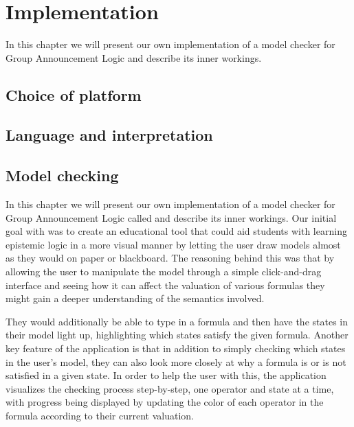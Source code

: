 \section{Implementation}\label{sec:impl}

In this chapter we will present our own implementation of a model checker for Group Announcement Logic and describe its inner workings.

\subsection{Choice of platform}

\subsection{Language and interpretation}

\subsection{Model checking}




In this chapter we will present our own implementation of a model checker for Group Announcement Logic called \cname and describe its inner workings. Our initial goal with \cname was to create an educational tool that could aid students with learning epistemic logic in a more visual manner by letting the user draw models almost as they would on paper or blackboard. The reasoning behind this was that by allowing the user to manipulate the model through a simple click-and-drag interface and seeing how it can affect the valuation of various formulas they might gain a deeper understanding of the semantics involved.

They would additionally be able to type in a formula and then have the states in their model light up, highlighting which states satisfy the given formula. Another key feature of the application is that in addition to simply checking which states in the user's model, they can also look more closely at why a formula is or is not satisfied in a given state. In order to help the user with this, the application visualizes the checking process step-by-step, one operator and state at a time, with progress being displayed by updating the color of each operator in the formula according to their current valuation.

